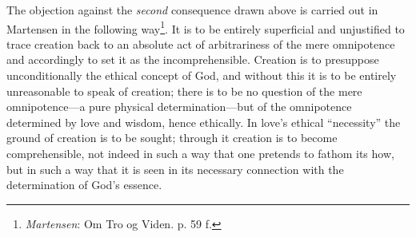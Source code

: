 \documentclass[12pt,a4paper]{book}
\begin{document}
The objection against the \emph{second} consequence drawn above is carried out in Martensen
in the following way\footnote{\emph{Martensen}: Om Tro og Viden. p. 59 f.}. It is to be entirely
superficial and unjustified to trace creation back to an absolute act of arbitrariness of
the mere omnipotence and accordingly to set it as the incomprehensible. Creation is to
presuppose unconditionally the ethical concept of God, and without this it is to be entirely
unreasonable to speak of creation; there is to be no question of the mere
omnipotence---a pure physical determination---but of the omnipotence determined by love and
wisdom, hence ethically. In love's ethical ``necessity'' the ground of creation is to be
sought; through it creation is to become comprehensible, not indeed in such a way that one
pretends to fathom its how, but in such a way that it is seen in its necessary connection
with the determination of God's essence.
\end{document}
